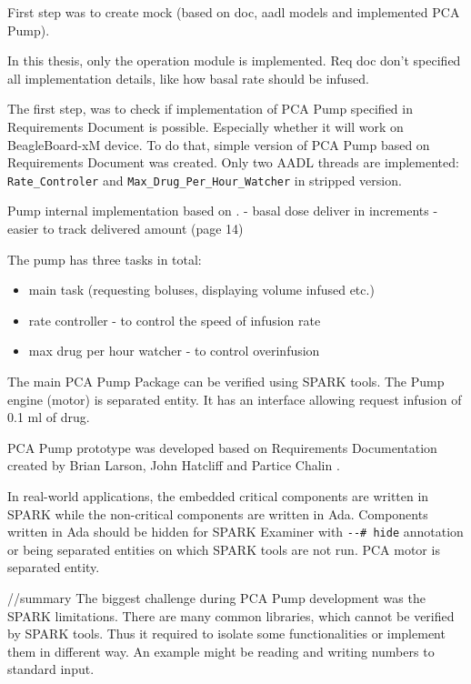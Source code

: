 First step was to create mock (based on doc, aadl models and implemented PCA Pump).

In this thesis, only the operation module is implemented. Req doc don't specified all implementation details, like how basal rate should be infused.

The first step, was to check if implementation of PCA Pump specified in Requirements Document is possible. Especially whether it will work on BeagleBoard-xM device. To do that, simple version of PCA Pump based on Requirements Document was created. Only two AADL threads are implemented: \lstinline{Rate_Controler} and \lstinline{Max_Drug_Per_Hour_Watcher} in stripped version.

Pump internal implementation based on \cite{CADD-PrizmAmbulatoryInfusionPump:Online}.
- basal dose deliver in increments - easier to track delivered amount (page 14)

The pump has three tasks in total:
\begin{itemize}
    \item main task (requesting boluses, displaying volume infused etc.)
    \item rate controller - to control the speed of infusion rate
    \item max drug per hour watcher - to control overinfusion
\end{itemize}

The main PCA Pump Package can be verified using SPARK tools. The Pump engine (motor) is separated entity. It has an interface allowing request infusion of 0.1 ml of drug.

PCA Pump prototype was developed based on Requirements Documentation created by Brian Larson, John Hatcliff and Partice Chalin \cite{PcaReq}.

In real-world applications, the embedded critical components are written in SPARK while the non-critical components are written in Ada. Components written in Ada should be hidden for SPARK Examiner with \lstinline{--# hide} annotation or being separated entities on which SPARK tools are not run. PCA motor is separated entity.

//summary
The biggest challenge during PCA Pump development was the SPARK limitations. There are many common libraries, which cannot be verified by SPARK tools. Thus it required to isolate some functionalities or implement them in different way. An example might be reading and writing numbers to standard input.



